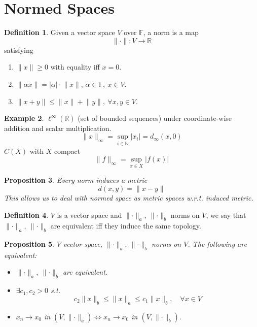 \documentclass[11pt,a4paper]{article}
\theoremstyle{definition}
\newtheorem{definition}{Definition}[section]
\newtheorem{example}[definition]{Example}
\theoremstyle{plain}
\newtheorem{proposition}[definition]{Proposition}
\theoremstyle{remark}
\newcommand{\F}{\mathbb{F}}
\newcommand{\R}{\mathbb{R}}
\newcommand{\N}{\mathbb{N}}
\newcommand{\abs}[1]{\lvert #1 \rvert}
\newcommand{\norm}[1]{\lVert #1 \rVert}
\newcommand{\1}{\mathbbm{1}}
\begin{document}
\section{Normed Spaces}

\begin{definition}
    Given a vector space $V$ over $\F$, a norm is a map 
    $$\norm{\cdot} \colon V \to \R$$
    satisfying 
    \begin{enumerate}[label = \roman*)]
        \item $\norm{x} \ge 0$ with equality iff $x = 0$.
        \item $\norm{\alpha x} = \abs{\alpha} \cdot \norm{x}$, $\alpha \in \F, \ x \in V$.
        \item $\norm{x + y} \le \norm{x} + \norm{y}, \ \forall x, y \in V$.
    \end{enumerate}
\end{definition}

\begin{example}
    $\ell^\infty(\R)$ (set of bounded sequences) under coordinate-wise addition and scalar multiplication. 
    $$\norm{x}_\infty = \sup_{i \in \N} \abs{x_i} = d_\infty (x, 0)$$
    $C(X)$ with $X$ compact 
    $$\norm{f}_\infty = \sup_{x \in X} \abs{f(x)}$$ 
\end{example}

\begin{proposition}
    Every norm induces a metric 
    $$d(x, y) = \norm{x-y}$$
    This allows us to deal with normed space as metric spaces w.r.t. induced metric.
\end{proposition}

\begin{definition}
    $V$ is a vector space and $\norm{\cdot}_a, \ \norm{\cdot}_b$ norms on $V$, we say that $\norm{\cdot}_a, \ \norm{\cdot}_b$ are equivalent iff 
    they induce the same topology.
\end{definition}

\begin{proposition}
    $V$ vector space, $\norm{\cdot}_a, \ \norm{\cdot}_b$ norms on $V$. The following are equivalent: 
    \begin{itemize}
        \item $\norm{\cdot}_a, \ \norm{\cdot}_b$ are equivalent.
        \item $\exists c_1, c_2 > 0$ s.t. 
        $$c_2 \norm{x}_b \le \norm{x}_a \le c_1 \norm{x}_b, \quad \forall x \in V$$
        \item $x_n \to x_0$ in $(V, \norm{\cdot}_a) \iff x_n \to x_0$ in $(V, \norm{\cdot}_b)$.
    \end{itemize}
\end{proposition}
\end{document}
